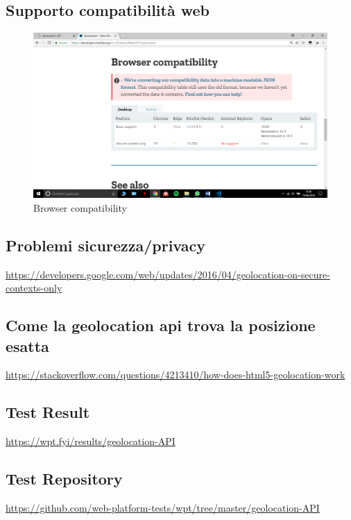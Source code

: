 \documentclass[italian]{article}
\begin{document}
	\subsection{Supporto compatibilità web}
	\begin{figure}[h]
		\centering
		\includegraphics[width=1\linewidth]{web1}
		\caption[Prova]{Browser compatibility}
		\label{fig:Browser compatibility}
	\end{figure}
	
	\subsection{Problemi sicurezza/privacy}
	\url{https://developers.google.com/web/updates/2016/04/geolocation-on-secure-contexts-only}
	
	\subsection{Come la geolocation api trova la posizione esatta}
	\url{https://stackoverflow.com/questions/4213410/how-does-html5-geolocation-work}
	
	\subsection{Test Result}
	\url{https://wpt.fyi/results/geolocation-API}
	
	\subsection{Test Repository}
	\url{https://github.com/web-platform-tests/wpt/tree/master/geolocation-API}
	
\end{document}
